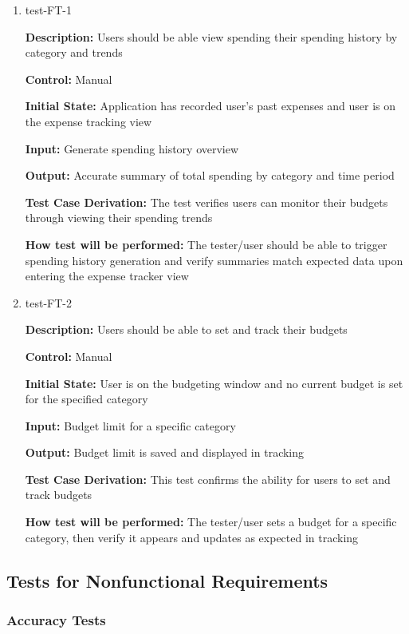 \documentclass[12pt, titlepage]{article}
\begin{document}
\begin{enumerate}

\item{test-FT-1\\}

\textbf{Description:} Users should be able view spending their spending history by category and trends

\textbf{Control:} Manual

\textbf{Initial State:} Application has recorded user's past expenses and user is on the expense tracking view

\textbf{Input:} Generate spending history overview

\textbf{Output:} Accurate summary of total spending by category and time period

\textbf{Test Case Derivation:} The test verifies users can monitor their budgets through viewing their spending trends

\textbf{How test will be performed:} The tester/user should be able to trigger spending history generation and verify summaries match expected data upon entering the expense tracker view

\item{test-FT-2\\}

\textbf{Description:} Users should be able to set and track their budgets

\textbf{Control:} Manual

\textbf{Initial State:} User is on the budgeting window and no current budget is set for the specified category

\textbf{Input:} Budget limit for a specific category

\textbf{Output:} Budget limit is saved and displayed in tracking

\textbf{Test Case Derivation:} This test confirms the ability for users to set and track budgets

\textbf{How test will be performed:} The tester/user sets a budget for a specific category, then verify it appears and updates as expected in tracking

\end{enumerate}

\subsection{Tests for Nonfunctional Requirements}

\subsubsection{Accuracy Tests}
\end{document}
